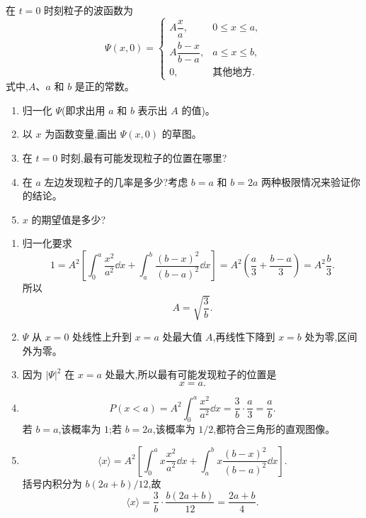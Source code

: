 \begin{question}
在 $t=0$ 时刻粒子的波函数为
\[
\Psi(x,0)=
\begin{cases}
A\dfrac{x}{a}, & 0\le x\le a,\\[0.6em]
A\dfrac{b-x}{b-a}, & a\le x\le b,\\[0.6em]
0, & \text{其他地方}.
\end{cases}
\]
式中,$A$、$a$ 和 $b$ 是正的常数。
\begin{enumerate}
\item 归一化 $\Psi$(即求出用 $a$ 和 $b$ 表示出 $A$ 的值)。
\item 以 $x$ 为函数变量,画出 $\Psi(x,0)$ 的草图。
\item 在 $t=0$ 时刻,最有可能发现粒子的位置在哪里?
\item 在 $a$ 左边发现粒子的几率是多少?考虑 $b=a$ 和 $b=2a$ 两种极限情况来验证你的结论。
\item $x$ 的期望值是多少?
\end{enumerate}
\end{question}
\begin{solution}
\begin{enumerate}
\item 归一化要求
\[
1=A^2\left[\int_0^a\frac{x^2}{a^2}\dd x+
\int_a^b\frac{(b-x)^2}{(b-a)^2}\dd x\right]
=A^2\left(\frac a3+\frac{b-a}{3}\right)
=A^2\frac b3.
\]
所以
\[
A=\sqrt{\frac{3}{b}}.
\]
\item $\Psi$ 从 $x=0$ 处线性上升到 $x=a$ 处最大值 $A$,再线性下降到 $x=b$ 处为零,区间外为零。
\item 因为 $|\Psi|^2$ 在 $x=a$ 处最大,所以最有可能发现粒子的位置是
\[
x=a.
\]
\item
\[
P(x<a)=A^2\int_0^a\frac{x^2}{a^2}\dd x
=\frac{3}{b}\cdot\frac a3=\frac ab.
\]
若 $b=a$,该概率为 $1$;若 $b=2a$,该概率为 $1/2$,都符合三角形的直观图像。
\item
\[
\langle x\rangle=A^2\left[\int_0^a x\frac{x^2}{a^2}\dd x+
\int_a^b x\frac{(b-x)^2}{(b-a)^2}\dd x\right].
\]
括号内积分为 $b(2a+b)/12$,故
\[
\langle x\rangle=\frac{3}{b}\cdot\frac{b(2a+b)}{12}=\frac{2a+b}{4}.
\]
\end{enumerate}
\end{solution}

